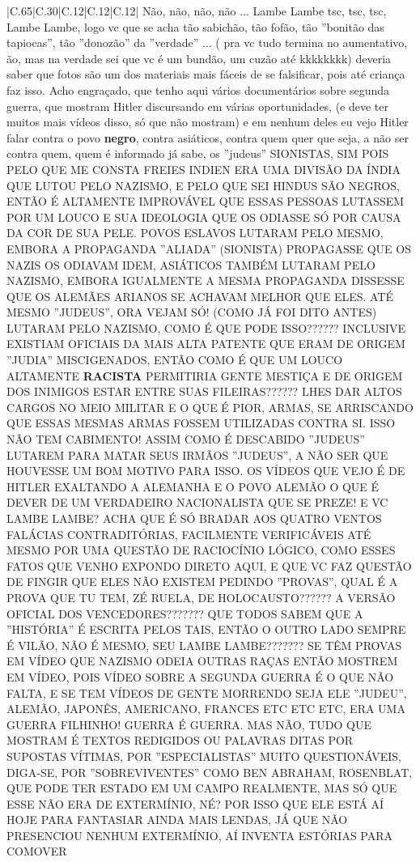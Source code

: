 \documentclass[11pt]{article}
\newlength\mylength
\begin{document}
\begin{center}
\begin{longtable}{|C{.65\mylength}|C{.30\mylength}|C{.12\mylength}|C{.12\mylength}|C{.12\mylength}|}
  \small Não, não, não, não ... Lambe Lambe tsc, tsc, tsc, Lambe Lambe, logo vc que se acha tão sabichão, tão fofão, tão ''bonitão das tapiocas'', tão ''donozão'' da ''verdade'' ... ( pra vc tudo termina no aumentativo, ão, mas na verdade sei que vc é um bundão, um cuzão até kkkkkkkk) deveria saber que fotos são um dos materiais mais fáceis de se falsificar, pois até criança faz isso. Acho engraçado, que tenho aqui vários documentários sobre segunda guerra, que mostram Hitler discursando em várias oportunidades, (e deve ter muitos mais vídeos disso, só que não mostram) e em nenhum deles eu vejo Hitler falar contra o povo \textbf{negro}, contra asiáticos, contra quem quer que seja, a não ser contra quem, quem é informado já sabe, os ''judeus'' SIONISTAS, SIM POIS PELO QUE ME CONSTA FREIES INDIEN ERA UMA DIVISÃO DA ÍNDIA QUE LUTOU PELO NAZISMO, E PELO QUE SEI HINDUS SÃO NEGROS, ENTÃO É ALTAMENTE IMPROVÁVEL QUE ESSAS PESSOAS LUTASSEM POR UM LOUCO E SUA IDEOLOGIA QUE OS ODIASSE SÓ POR CAUSA DA COR DE SUA PELE. POVOS ESLAVOS LUTARAM PELO MESMO, EMBORA A PROPAGANDA ''ALIADA'' (SIONISTA) PROPAGASSE QUE OS NAZIS OS ODIAVAM IDEM, ASIÁTICOS TAMBÉM LUTARAM PELO NAZISMO, EMBORA IGUALMENTE A MESMA PROPAGANDA DISSESSE QUE OS ALEMÃES ARIANOS SE ACHAVAM MELHOR QUE ELES. ATÉ MESMO ''JUDEUS'', ORA VEJAM SÓ! (COMO JÁ FOI DITO ANTES) LUTARAM PELO NAZISMO, COMO É QUE PODE ISSO?????? INCLUSIVE EXISTIAM OFICIAIS DA MAIS ALTA PATENTE QUE ERAM DE ORIGEM ''JUDIA'' MISCIGENADOS, ENTÃO COMO É QUE UM LOUCO ALTAMENTE \textbf{RACISTA} PERMITIRIA GENTE MESTIÇA E DE ORIGEM DOS INIMIGOS ESTAR ENTRE SUAS FILEIRAS?????? LHES DAR ALTOS CARGOS NO MEIO MILITAR E O QUE É PIOR, ARMAS, SE ARRISCANDO QUE ESSAS MESMAS ARMAS FOSSEM UTILIZADAS CONTRA SI. ISSO NÃO TEM CABIMENTO! ASSIM COMO É DESCABIDO ''JUDEUS'' LUTAREM PARA MATAR SEUS IRMÃOS ''JUDEUS'', A NÃO SER QUE HOUVESSE UM BOM MOTIVO PARA ISSO. OS VÍDEOS QUE VEJO É DE HITLER EXALTANDO A ALEMANHA E O POVO ALEMÃO O QUE É DEVER DE UM VERDADEIRO NACIONALISTA QUE SE PREZE! E VC LAMBE LAMBE? ACHA QUE É SÓ BRADAR AOS QUATRO VENTOS FALÁCIAS CONTRADITÓRIAS, FACILMENTE VERIFICÁVEIS ATÉ MESMO POR UMA QUESTÃO DE RACIOCÍNIO LÓGICO, COMO ESSES FATOS QUE VENHO EXPONDO DIRETO AQUI, E QUE VC FAZ QUESTÃO DE FINGIR QUE ELES NÃO EXISTEM PEDINDO ''PROVAS'', QUAL É A PROVA QUE TU TEM, ZÉ RUELA, DE HOLOCAUSTO??????  A VERSÃO OFICIAL DOS VENCEDORES??????? QUE TODOS SABEM QUE A ''HISTÓRIA'' É ESCRITA PELOS TAIS, ENTÃO O OUTRO LADO SEMPRE É VILÃO, NÃO É MESMO, SEU LAMBE LAMBE??????? SE TÊM PROVAS EM VÍDEO QUE NAZISMO ODEIA OUTRAS RAÇAS ENTÃO MOSTREM EM VÍDEO, POIS VÍDEO SOBRE A SEGUNDA GUERRA É O QUE NÃO FALTA, E SE TEM VÍDEOS DE GENTE MORRENDO SEJA ELE ''JUDEU'', ALEMÃO, JAPONÊS, AMERICANO, FRANCES ETC ETC ETC, ERA UMA GUERRA FILHINHO! GUERRA É GUERRA. MAS NÃO, TUDO QUE MOSTRAM É TEXTOS REDIGIDOS OU PALAVRAS DITAS POR SUPOSTAS VÍTIMAS, POR ''ESPECIALISTAS'' MUITO QUESTIONÁVEIS, DIGA-SE, POR ''SOBREVIVENTES'' COMO BEN ABRAHAM, ROSENBLAT, QUE PODE TER ESTADO EM UM CAMPO REALMENTE, MAS SÓ QUE ESSE NÃO ERA DE EXTERMÍNIO, NÉ? POR ISSO QUE ELE ESTÁ AÍ HOJE PARA FANTASIAR AINDA MAIS LENDAS, JÁ QUE NÃO PRESENCIOU NENHUM EXTERMÍNIO, AÍ INVENTA ESTÓRIAS PARA COMOVER 
\end{longtable}
\end{center}
\end{document}
